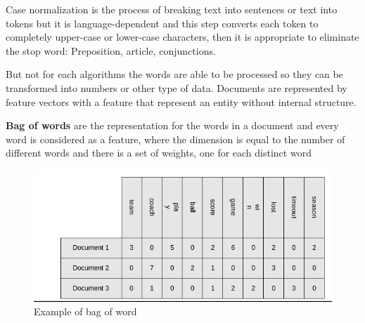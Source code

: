 Case normalization is the process of breaking text into sentences or text into tokens but it is language-dependent and this step converts each token to completely upper-case or lower-case characters, then it is appropriate to eliminate the stop word: Preposition, article, conjunctions.

But not for each algorithms the words are able to be processed so they can be transformed into numbers or other type of data. Documents are represented by feature vectors with a feature that represent an entity without internal structure.

\textbf{Bag of words} are the representation for the words in a document and every word is considered as a feature, where the dimension is equal to the number of different words and there is a set of weights, one for each distinct word

\begin{figure}[H]
    \centering
    \includegraphics[scale=0.6]{images/Data pre-process/Word-bag.png}
    \caption{Example of bag of word}
    \label{fig:enter-label}
\end{figure}

